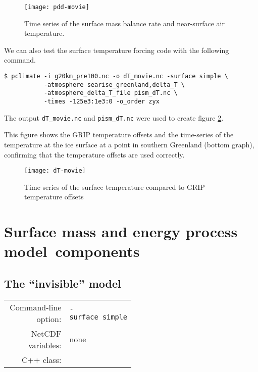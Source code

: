\documentclass[titlepage,letterpaper,final]{scrartcl}
\begin{document}
\begin{figure}[ht]
  \centering
  \texttt{[image: pdd-movie]}
  \caption{Time series of the surface mass balance rate and near-surface air temperature.}
  \label{fig:pddseries}
\end{figure}

\bigskip
We can also test the surface temperature forcing code with the following command.
\begin{verbatim}
$ pclimate -i g20km_pre100.nc -o dT_movie.nc -surface simple \
           -atmosphere searise_greenland,delta_T \
           -atmosphere_delta_T_file pism_dT.nc \
           -times -125e3:1e3:0 -o_order zyx
\end{verbatim}%
The output \texttt{dT_movie.nc} and \texttt{pism_dT.nc} were used to create figure \ref{fig:artm-timeseries}.

This figure shows the GRIP temperature offsets and the time-series of the temperature at the ice surface at a point in southern Greenland (bottom graph), confirming that the temperature offsets are used correctly.

\begin{figure}[ht]
  \centering
  \texttt{[image: dT-movie]}
  \caption{Time series of the surface temperature compared to GRIP temperature offsets}
  \label{fig:artm-timeseries}
\end{figure}


\clearpage\newpage
\newcommand{\surface}{Surface components (\texttt{-surface}; default: \texttt{given})}
\section{Surface mass and energy process model~components}
\label{sec:surface}

\subsection{The ``invisible'' model}
\label{sec:surface-simple}

\begin{center}
  \begin{tabular}{rp{0.5\linewidth}}
    \toprule
    Command-line option: & \texttt{-surface~simple} \index[options]{SA@\surface!\texttt{simple}}\\
    NetCDF variables: & none \\
    C++ class: & \class{PSSimple}\\
    \bottomrule
  \end{tabular}
\end{center}
\end{document}
